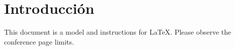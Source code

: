 \section{Introducción}
This document is a model and instructions for \LaTeX.
Please observe the conference page limits. 